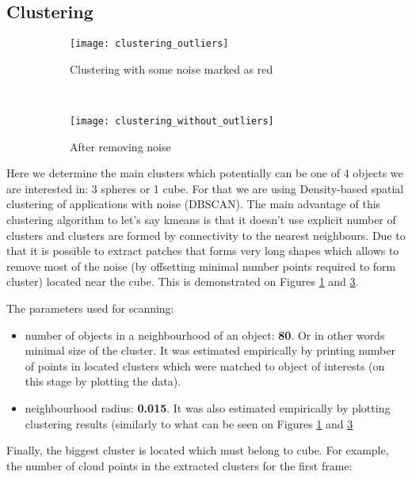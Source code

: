 \documentclass[a4paper,11pt]{article}
\theoremstyle{mytheor}
\begin{document}
\subsection{Clustering}

\begin{figure}[htbp!]
    \centering
    \begin{subfigure}[t]{0.45\textwidth}
        \centering
        \texttt{[image: clustering\_outliers]}
        \caption{Clustering with some noise marked as red}
        \label{fig:clustering_outliers}
    \end{subfigure}%
    ~ 
    \centering
    \begin{subfigure}[t]{0.45\textwidth}
        \centering
        \texttt{[image: clustering\_without\_outliers]}
        \caption{After removing noise}
        \label{fig:clustering_without_outliers}
    \end{subfigure}
    \caption{}
\end{figure}


Here we determine the main clusters which potentially can be one of 4 objects we are interested in: 3 spheres or 1 cube. For that we are using Density-based spatial clustering of applications with noise (DBSCAN). The main advantage of this clustering algorithm to let's say kmeans is that it doesn't use explicit number of clusters and clusters are formed by connectivity to the nearest neighbours. Due to that it is possible to extract patches that forms very long shapes which allows to remove most of the noise (by offsetting minimal number points required to form cluster) located near the cube. This is demonstrated on Figures \ref{fig:clustering_outliers} and \ref{fig:clustering_without_outliers}. 

The parameters used for scanning:
\begin{itemize}
  \item number of objects in a neighbourhood of an object: \textbf{80}. Or in other words minimal size of the cluster. It was estimated empirically by printing number of points in located clusters which were matched to object of interests (on this stage by plotting the data). 
  \item neighbourhood radius: \textbf{0.015}. It was also estimated empirically by plotting clustering results (similarly to what can be seen on Figures \ref{fig:clustering_outliers} and \ref{fig:clustering_without_outliers}
\end{itemize}

Finally, the biggest cluster is located which must belong to cube. For example, the number of cloud points in the extracted clusters for the first frame:
\end{document}
